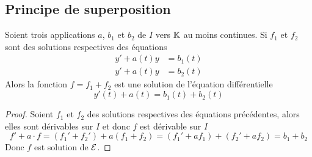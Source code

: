 \subsection{Principe de superposition}
\label{subsec:principesuperposition}
\begin{prop}
  Soient trois applications \(a\), \(b_1\) et \(b_2\) de \(I\) vers \(\mathbb{K}\) au moins continues. Si \(f_1\) et \(f_2\) sont des solutions respectives des équations
  \begin{align}
    y'+a(t)y&=b_1(t)\\ y'+a(t)y&=b_2(t)
  \end{align}
Alors la fonction \(f=f_1+f_2\) est une solution de l'équation différentielle 
\begin{equation}
  y'(t)+a(t)=b_1(t)+b_2(t)
\end{equation}
\end{prop}
\begin{proof}
  Soient \(f_1\) et \(f_2\) des solutions respectives des équations précédentes, alors elles sont dérivables sur \(I\) et donc \(f\) est dérivable sur \(I\)
  \begin{equation}
    f'+a \cdot f=(f_1' + f_2')+a(f_1+f_2)=(f_1'+af_1)+(f_2'+af_2)=b_1+b_2
  \end{equation}
Donc \(f\) est solution de \(\mathcal{E}\).
\end{proof}
%

